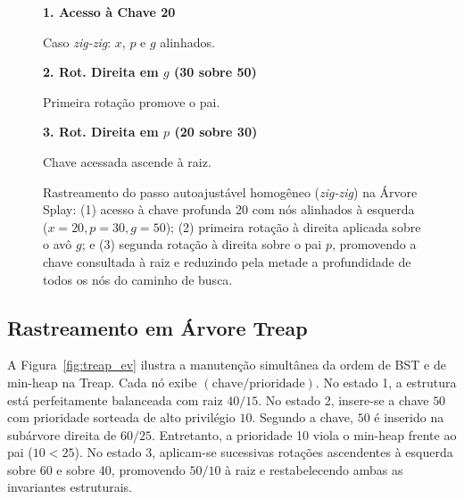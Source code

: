 \documentclass[11pt,a4paper]{article}
\begin{document}
\begin{figure}[htbp]
\centering
\begin{minipage}[t]{0.31\textwidth}
\centering\textbf{1. Acesso à Chave 20}\par\smallskip
{}
\par\tiny Caso \textit{zig-zig}: $x$, $p$ e $g$ alinhados.
\end{minipage}\hfill
\begin{minipage}[t]{0.31\textwidth}
\centering\textbf{2. Rot. Direita em $g$ (30 sobre 50)}\par\smallskip
{}
\par\tiny Primeira rotação promove o pai.
\end{minipage}\hfill
\begin{minipage}[t]{0.31\textwidth}
\centering\textbf{3. Rot. Direita em $p$ (20 sobre 30)}\par\smallskip
{}
\par\tiny Chave acessada ascende à raiz.
\end{minipage}
\caption{Rastreamento do passo autoajustável homogêneo (\textit{zig-zig}) na Árvore Splay: (1) acesso à chave profunda 20 com nós alinhados à esquerda ($x=20, p=30, g=50$); (2) primeira rotação à direita aplicada sobre o avô $g$; e (3) segunda rotação à direita sobre o pai $p$, promovendo a chave consultada à raiz e reduzindo pela metade a profundidade de todos os nós do caminho de busca.}
\label{fig:splay_ev}
\end{figure}

\subsection{Rastreamento em Árvore Treap}
A Figura~\ref{fig:treap_ev} ilustra a manutenção simultânea da ordem de BST e de min-heap na Treap. Cada nó exibe $(\text{chave}/\text{prioridade})$. No estado 1, a estrutura está perfeitamente balanceada com raiz $40/15$. No estado 2, insere-se a chave $50$ com prioridade sorteada de alto privilégio $10$. Segundo a chave, $50$ é inserido na subárvore direita de $60/25$. Entretanto, a prioridade 10 viola o min-heap frente ao pai ($10 < 25$). No estado 3, aplicam-se sucessivas rotações ascendentes à esquerda sobre 60 e sobre 40, promovendo $50/10$ à raiz e restabelecendo ambas as invariantes estruturais.
\end{document}
